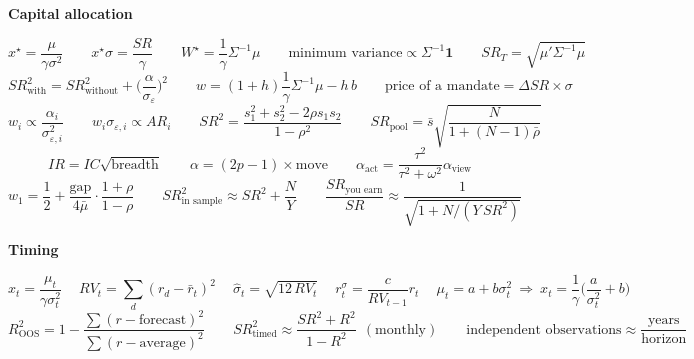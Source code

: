 \documentclass[11pt]{article}
\newif\ifsolutions
\newcounter{ex}[section]
\newcommand{\head}[1]{\par\medskip\textbf{#1}\par}
\newcommand{\SR}{\mathit{SR}}
\newcommand{\AR}{\mathit{AR}}
\newcommand{\IR}{\mathit{IR}}
\newcommand{\RV}{\mathit{RV}}
\begin{document}
{\head{Capital allocation}
\[ x^{\star} = \frac{\mu}{\gamma\sigma^{2}} \qquad x^{\star}\sigma = \frac{\SR}{\gamma} \qquad W^{\star} = \frac{1}{\gamma}\Sigma^{-1}\mu
   \qquad \text{minimum variance} \propto \Sigma^{-1}\mathbf{1} \qquad \SR_{T} = \sqrt{\mu'\Sigma^{-1}\mu} \]
\[ \SR^{2}_{\text{with}} = \SR^{2}_{\text{without}} + \Big(\frac{\alpha}{\sigma_{\varepsilon}}\Big)^{2} \qquad
   w = (1+h)\frac{1}{\gamma}\Sigma^{-1}\mu - h\,b \qquad \text{price of a mandate} = \Delta\SR\times\sigma \]
\[ w_{i} \propto \frac{\alpha_{i}}{\sigma_{\varepsilon,i}^{2}} \qquad w_{i}\sigma_{\varepsilon,i} \propto \AR_{i} \qquad
   \SR^{2} = \frac{s_{1}^{2} + s_{2}^{2} - 2\rho s_{1}s_{2}}{1 - \rho^{2}} \qquad
   \SR_{\text{pool}} = \bar s\sqrt{\frac{N}{1 + (N-1)\bar\rho}} \]
\[ \IR = IC\sqrt{\text{breadth}} \qquad \alpha = (2p - 1)\times\text{move} \qquad
   \alpha_{\text{act}} = \frac{\tau^{2}}{\tau^{2} + \omega^{2}}\alpha_{\text{view}} \]
\[ w_{1} = \frac{1}{2} + \frac{\text{gap}}{4\bar\mu}\cdot\frac{1+\rho}{1-\rho} \qquad
   \SR^{2}_{\text{in sample}} \approx \SR^{2} + \frac{N}{Y} \qquad
   \frac{\SR_{\text{you earn}}}{\SR} \approx \frac{1}{\sqrt{1 + N/(Y\,\SR^{2})}} \]

\head{Timing}
\[ x_{t} = \frac{\mu_{t}}{\gamma\sigma_{t}^{2}} \quad\ \RV_{t} = \sum_{d}(r_{d} - \bar r_{t})^{2} \quad\
   \hat\sigma_{t} = \sqrt{12\,\RV_{t}} \quad\ r^{\sigma}_{t} = \frac{c}{\RV_{t-1}}r_{t} \quad\
   \mu_{t} = a + b\sigma_{t}^{2}\ \Rightarrow\ x_{t} = \frac{1}{\gamma}\Big(\frac{a}{\sigma_{t}^{2}} + b\Big) \]
\[ R^{2}_{\text{OOS}} = 1 - \frac{\sum(r - \text{forecast})^{2}}{\sum(r - \text{average})^{2}} \qquad
   \SR^{2}_{\text{timed}} \approx \frac{\SR^{2} + R^{2}}{1 - R^{2}}\ \ (\text{monthly}) \qquad
   \text{independent observations} \approx \frac{\text{years}}{\text{horizon}} \]
}\label{sec:sheetend}

\ifsolutions
\newpage
\end{document}

